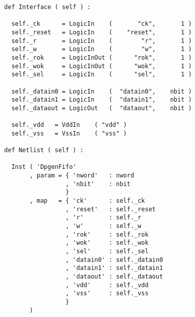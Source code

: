 \begin{itemize}
\begin{verbatim}
  def Interface ( self ) :  

    self._ck      = LogicIn    (       "ck",       1 )
    self._reset   = LogicIn    (    "reset",       1 )
    self._r       = LogicIn    (        "r",       1 )
    self._w       = LogicIn    (        "w",       1 )
    self._rok     = LogicInOut (      "rok",       1 )
    self._wok     = LogicInOut (      "wok",       1 )
    self._sel     = LogicIn    (      "sel",       1 )
    
    self._datain0 = LogicIn    (  "datain0",    nbit )
    self._datain1 = LogicIn    (  "datain1",    nbit )
    self._dataout = LogicOut   (  "dataout",    nbit ) 
    
    self._vdd   = VddIn    ( "vdd" )
    self._vss   = VssIn    ( "vss" )
    
  def Netlist ( self ) :
      
    Inst ( 'DpgenFifo'
         , param = { 'nword'   : nword
                   , 'nbit'    : nbit
                   }
         , map   = { 'ck'      : self._ck
                   , 'reset'   : self._reset
                   , 'r'       : self._r
                   , 'w'       : self._w
                   , 'rok'     : self._rok
                   , 'wok'     : self._wok
                   , 'sel'     : self._sel
                   , 'datain0' : self._datain0
                   , 'datain1' : self._datain1
                   , 'dataout' : self._dataout
                   , 'vdd'     : self._vdd
                   , 'vss'     : self._vss
                   }
         )
\end{verbatim}
\end{itemize}
